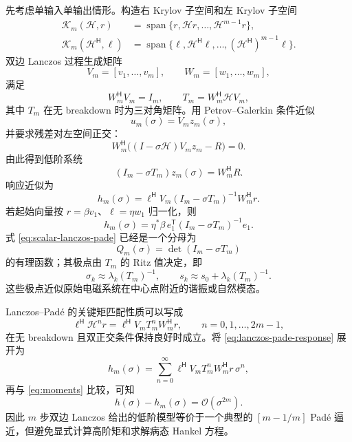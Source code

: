 \documentclass[UTF8,a4paper,11pt]{ctexart}
\newcommand{\cH}{\mathcal{H}}
\newcommand{\cK}{\mathcal{K}}
\newcommand{\cO}{\mathcal{O}}
\newcommand{\transpose}{\mathsf{T}}
\newcommand{\herm}{\mathsf{H}}
\begin{document}
先考虑单输入单输出情形。构造右 Krylov 子空间和左 Krylov 子空间
\begin{align}
    \cK_m(\cH,r)
    &=\operatorname{span}\{r,\cH r,\ldots,\cH^{m-1}r\},\\
    \cK_m(\cH^{\herm},\ell)
    &=\operatorname{span}\{\ell,\cH^{\herm}\ell,\ldots,(\cH^{\herm})^{m-1}\ell\}.
\end{align}
双边 Lanczos 过程生成矩阵
\[
    V_m=[v_1,\ldots,v_m],\qquad
    W_m=[w_1,\ldots,w_m],
\]
满足
\begin{equation}
    W_m^{\herm}V_m=I_m,\qquad
    T_m=W_m^{\herm}\cH V_m ,
    \label{eq:lanczos-proj}
\end{equation}
其中 $T_m$ 在无 breakdown 时为三对角矩阵。用 Petrov--Galerkin 条件近似
\[
    u_m(\sigma)=V_m z_m(\sigma),
\]
并要求残差对左空间正交：
\[
    W_m^{\herm}\bigl((I-\sigma\cH)V_mz_m-R\bigr)=0 .
\]
由此得到低阶系统
\begin{equation}
    (I_m-\sigma T_m)z_m(\sigma)=W_m^{\herm}R .
    \label{eq:reduced-system}
\end{equation}
响应近似为
\begin{equation}
    h_m(\sigma)
    =
    \ell^{\herm}V_m
    (I_m-\sigma T_m)^{-1}
    W_m^{\herm}r .
    \label{eq:lanczos-pade-response}
\end{equation}
若起始向量按 $r=\beta v_1$、$\ell=\eta w_1$ 归一化，则
\begin{equation}
    h_m(\sigma)
    =
    \eta^*\beta\,
    e_1^{\transpose}
    (I_m-\sigma T_m)^{-1}
    e_1 .
    \label{eq:scalar-lanczos-pade}
\end{equation}
式 \eqref{eq:scalar-lanczos-pade} 已经是一个分母为
\[
    Q_m(\sigma)=\det(I_m-\sigma T_m)
\]
的有理函数；其极点由 $T_m$ 的 Ritz 值决定，即
\[
    \sigma_k\approx\lambda_k(T_m)^{-1},
    \qquad
    s_k\approx s_0+\lambda_k(T_m)^{-1}.
\]
这些极点近似原始电磁系统在中心点附近的谐振或自然模态。

Lanczos--Padé 的关键矩匹配性质可以写成
\begin{equation}
    \ell^{\herm}\cH^n r
    =
    \ell^{\herm}V_mT_m^nW_m^{\herm}r,
    \qquad
    n=0,1,\ldots,2m-1,
    \label{eq:moment-matching}
\end{equation}
在无 breakdown 且双正交条件保持良好时成立。将 \eqref{eq:lanczos-pade-response} 展开为
\[
    h_m(\sigma)
    =
    \sum_{n=0}^{\infty}
    \ell^{\herm}V_mT_m^nW_m^{\herm}r\,\sigma^n,
\]
再与 \eqref{eq:moments} 比较，可知
\begin{equation}
    h(\sigma)-h_m(\sigma)=\cO(\sigma^{2m}).
\end{equation}
因此 $m$ 步双边 Lanczos 给出的低阶模型等价于一个典型的 $[m-1/m]$ Padé 逼近，但避免显式计算高阶矩和求解病态 Hankel 方程。
\end{document}
